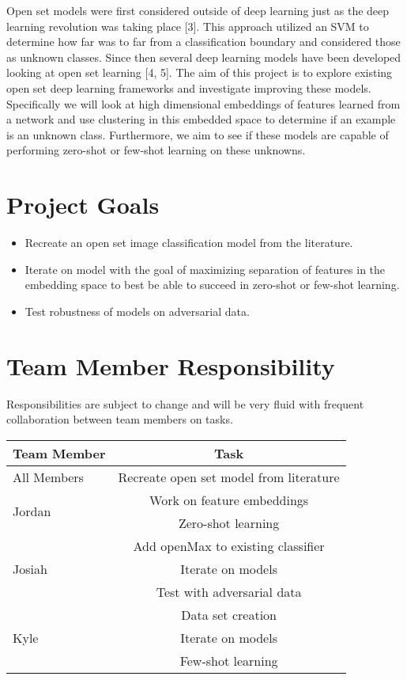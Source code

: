 \documentclass[conference]{IEEEtran}
\begin{document}
Open set models were first considered outside of deep learning just as the deep learning revolution was taking place [3]. This approach utilized an SVM to determine how far was to far from a classification boundary and considered those as unknown classes. Since then several deep learning models have been developed looking at open set learning [4, 5]. The aim of this project is to explore existing open set deep learning frameworks and investigate improving these models. Specifically we will look at high dimensional embeddings of features learned from a network and use clustering in this embedded space to determine if an example is an unknown class. Furthermore, we aim to see if these models are capable of performing zero-shot or few-shot learning on these unknowns.

\section{Project Goals}
\begin{itemize}
	\item Recreate an open set image classification model from the literature.
	\item Iterate on model with the goal of maximizing separation of features in the embedding space to best be able to succeed in zero-shot or few-shot learning.
	\item Test robustness of models on adversarial data.
\end{itemize}

\section{Team Member Responsibility}
Responsibilities are subject to change and will be very fluid with frequent collaboration between team members on tasks.\\

\begin{center}
\begin{tabular}{|l|c|} 
\hline
Team Member & Task \\
\hline
All Members & Recreate open set model from literature \\
\hline
\multirow{2}{3em}{Jordan} & Work on feature embeddings \\ 
& Zero-shot learning \\ 
\hline
\multirow{3}{3em}{Josiah} & Add openMax to existing classifier \\
& Iterate on models \\
& Test with adversarial data \\
\hline
\multirow{3}{3em}{Kyle} & Data set creation \\
& Iterate on models \\
& Few-shot learning \\
\hline
\end{tabular}
\end{center}
\end{document}
